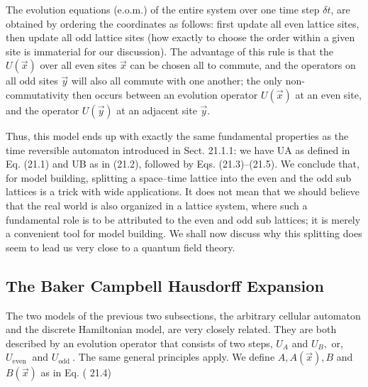 \documentclass[main.tex]{subfiles}
\begin{document}
The evolution equations (e.o.m.) of the entire system over one time step $\delta t$, are obtained by ordering the coordinates as follows: first update all even lattice sites, then update all odd lattice sites (how exactly to choose the order within a given site is immaterial for our discussion). The advantage of this rule is that the $U(\vec x)$ over all even sites $\vec x$ can be chosen all to commute, and the operators on all odd sites $\vec y$ will also all commute with one another; the only non-commutativity then occurs between an evolution operator $U(\vec x)$ at an even site, and the operator $U(\vec y)$ at an adjacent site $\vec y$.

Thus, this model ends up with exactly the same fundamental properties as the time reversible automaton introduced in Sect. 21.1.1: we have UA as defined in Eq. (21.1) and UB as in (21.2), followed by Eqs. (21.3)–(21.5).
We conclude that, for model building, splitting a space–time lattice into the even and the odd sub lattices is a trick with wide applications. It does not mean that we should believe that the real world is also organized in a lattice system, where such a fundamental role is to be attributed to the even and odd sub lattices; it is merely
a convenient tool for model building. We shall now discuss why this splitting does seem to lead us very close to a quantum field theory.


\subsection{The Baker Campbell Hausdorff Expansion}\label{ch21.2}

The two models of the previous two subsections, the arbitrary cellular automaton and the discrete Hamiltonian model, are very closely related. They are both described by an evolution operator that consists of two steps, $U_{A}$ and $U_{B},$ or, $U_{\text {even }}$ and $U_{\text {odd }}$. The same general principles apply. We define $A, A(\vec{x}), B$ and $B(\vec{x})$ as in Eq. ( 21.4)
\end{document}
